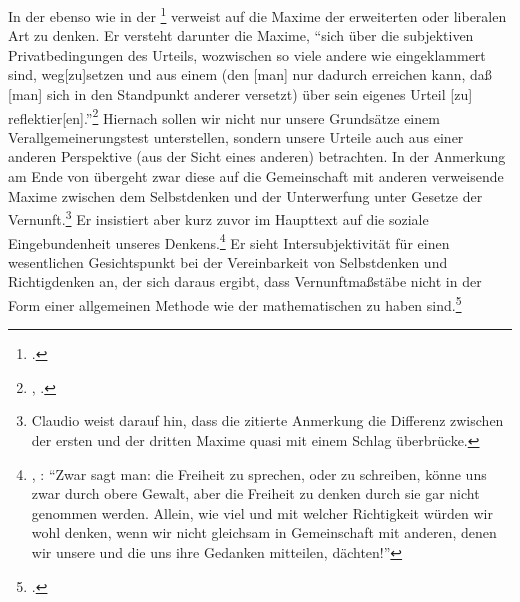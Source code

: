 In der  ebenso wie in der \footnote{\cite[Siehe][B
166\,f.,]{Kant:AnthropologieinpragmatischerHinsicht1977} \cite[][VII:
228.10--229.2]{Kant:GesammelteWerke1900ff.}.} verweist  auf
die Maxime der erweiterten oder liberalen Art zu denken. Er versteht darunter
die Maxime, \enquote{sich über die subjektiven
Privatbedingungen des Urteils, wozwischen so viele andere wie eingeklammert
sind, weg[zu]setzen \punkt{} und aus einem  (den
[man] nur dadurch erreichen kann, daß [man] sich in den Standpunkt anderer
versetzt) über sein eigenes Urteil [zu]
reflektier[en].}\footnote{\cite[\S~40]{Kant:KritikderUrteilskraft2009},
\cite[][V: 295.10--14]{Kant:GesammelteWerke1900ff.}.} Hiernach sollen wir nicht
nur unsere Grundsätze einem Verallgemeinerungstest unterstellen, sondern unsere
Urteile auch aus einer anderen Perspektive (aus der Sicht eines anderen)
betrachten. In der Anmerkung am Ende von  übergeht  zwar diese auf die Gemeinschaft mit
anderen verweisende  Maxime zwischen dem Selbstdenken und der Unterwerfung unter
Gesetze der Vernunft.\footnote{Claudio
\textcite[][133]{LaRocca:WasAufklaerungseinwird2004} weist darauf hin, dass die
zitierte Anmerkung die Differenz zwischen der ersten und der dritten Maxime
quasi mit einem Schlag überbrücke.} Er insistiert aber kurz zuvor im Haupttext
auf die soziale Eingebundenheit unseres Denkens.\footnote{\cite[Vgl.][A
325]{Kant:Washeisst:SichimDenkenorientieren?1977}, \cite[][VIII:
144.17--22]{Kant:GesammelteWerke1900ff.}: \enquote{Zwar sagt man:
die Freiheit zu sprechen, oder zu schreiben, könne uns zwar durch obere Gewalt,
aber die Freiheit zu denken durch sie gar nicht genommen werden. Allein, wie
viel und mit welcher Richtigkeit würden wir wohl denken, wenn wir nicht
gleichsam in Gemeinschaft mit anderen, denen wir unsere und die uns ihre
Gedanken mitteilen, dächten!}} Er sieht Intersubjektivität für
einen wesentlichen Gesichtspunkt bei der Vereinbarkeit von Selbstdenken und
Richtigdenken an, der sich daraus ergibt, dass Vernunftmaßstäbe nicht in der
Form einer allgemeinen Methode wie der mathematischen zu haben
sind.\footcite[Vgl.][\pno~214\,f.]{ONeill:AufgeklaerteVernunft1996}

